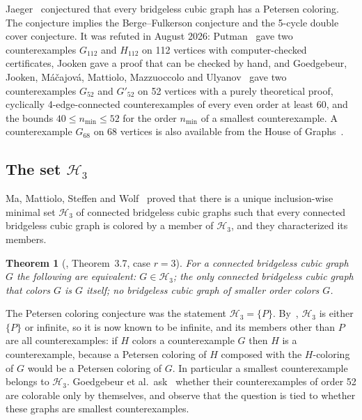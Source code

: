 \documentclass[11pt]{article}
\newtheorem{theorem}{Theorem}[section]
\theoremstyle{definition}
\theoremstyle{remark}
\newcommand{\PG}{P}
\newcommand{\Hthree}{\mathcal{H}_3}
\newcommand{\Ga}{G_{52}}
\newcommand{\Gb}{G'_{52}}
\newcommand{\Gsix}{G_{68}}
\newcommand{\Gmain}{G_{112}}
\newcommand{\Gsym}{H_{112}}
\begin{document}
Jaeger~\cite{Jaeger1988} conjectured that every bridgeless cubic graph has a Petersen coloring.
The conjecture implies the Berge--Fulkerson conjecture and the 5-cycle double cover conjecture.
It was refuted in August 2026: Putman~\cite{Putman2026} gave two counterexamples $\Gmain$ and
$\Gsym$ on 112 vertices with computer-checked certificates, Jooken gave a proof that can be
checked by hand, and Goedgebeur, Jooken, M\'a\v{c}ajov\'a, Mattiolo, Mazzuoccolo and
Ulyanov~\cite{GJMMMU2026} gave two counterexamples $\Ga$ and $\Gb$ on 52 vertices with a purely
theoretical proof, cyclically 4-edge-connected counterexamples of every even order at least 60,
and the bounds $40 \le n_{\min} \le 52$ for the order $n_{\min}$ of a smallest counterexample. A
counterexample $\Gsix$ on 68 vertices is also available from the House of
Graphs~\cite{HoG}.

\subsection{The set \texorpdfstring{$\Hthree$}{H3}}

Ma, Mattiolo, Steffen and Wolf~\cite{MMSW2025} proved that there is a unique inclusion-wise
minimal set $\Hthree$ of connected bridgeless cubic graphs such that every connected bridgeless
cubic graph is colored by a member of $\Hthree$, and they characterized its members.

\begin{theorem}[\cite{MMSW2025}, Theorem~3.7, case $r = 3$]\label{thm:mmsw}
For a connected bridgeless cubic graph $G$ the following are equivalent: $G \in \Hthree$; the only
connected bridgeless cubic graph that colors $G$ is $G$ itself; no bridgeless cubic graph of
smaller order colors $G$.
\end{theorem}

The Petersen coloring conjecture was the statement $\Hthree = \{\PG\}$. By~\cite{MMSW2025},
$\Hthree$ is either $\{\PG\}$ or infinite, so it is now known to be infinite, and its members other
than $\PG$ are all counterexamples: if $H$ colors a counterexample $G$ then $H$ is a
counterexample, because a Petersen coloring of $H$ composed with the $H$-coloring of $G$ would be
a Petersen coloring of $G$. In particular a smallest counterexample belongs to $\Hthree$.
Goedgebeur et al.\ ask~\cite[Section~5.4]{GJMMMU2026} whether their counterexamples of order 52
are colorable only by themselves, and observe that the question is tied to whether these graphs
are smallest counterexamples.
\end{document}

